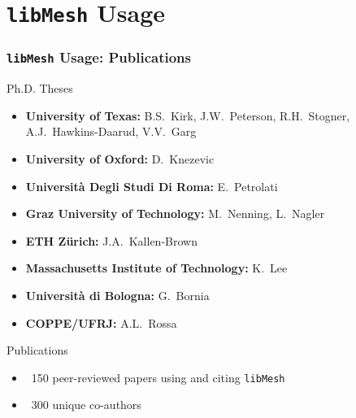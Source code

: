 \documentclass[mathserif]{beamer}
\newcommand{\software}[1]{\texttt{#1}}
\newcommand{\libMesh}{\software{libMesh}}
\begin{document}
\begin{frame}
\begin{columns}

\end{columns}
\end{frame}


\section{\libMesh{} Usage}

\begin{frame}
\frametitle{\libMesh{} Usage: Publications}

\begin{block}{Ph.D. Theses}
\begin{itemize}
\item {\textbf{University of Texas:}} B.S.~Kirk, J.W.~Peterson, R.H.~Stogner,
	A.J.~Hawkins-Daarud, V.V.~Garg

\item {\textbf{University of Oxford:}} D.~Knezevic

\item {\textbf{Università Degli Studi Di Roma:}} E.~Petrolati

\item {\textbf{Graz University of Technology:}} M.~Nenning, L.~Nagler

\item {\textbf{ETH Z\"{u}rich:}} J.A.~Kallen-Brown

\item {\textbf{Massachusetts Institute of Technology:}} K.~Lee

\item {\textbf{Università di Bologna:}} G.~Bornia

\item {\textbf{COPPE/UFRJ:}} A.L.~Rossa
\end{itemize}
\end{block}

\begin{block}{Publications}
\begin{itemize}
\item ~150 peer-reviewed papers using and citing \libMesh{}
\item ~300 unique co-authors
\end{itemize}
\end{block}

\end{frame}
\end{document}
